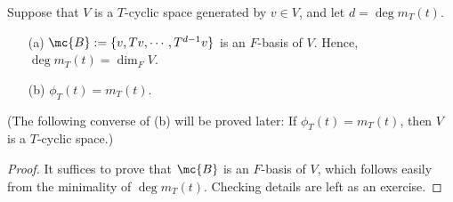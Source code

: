 \begin{lem}\label{T-cyclic basic}
    Suppose that $V$ is a $T$-cyclic space generated by $v\in V$, and let $d=\deg m_T(t)$.
    \begin{enumerate}
        \item[(a)]
        {
            $\mc{B}:=\{v, Tv, \cdots, T^{d-1}v\}$ is an $F$-basis of $V$.
            Hence, $\deg m_T(t)=\dim_F V$.
        }
        \item[(b)]
        {
            $\phi_T(t)=m_T(t)$.
        }
    \end{enumerate}
    (The following converse of (b) will be proved later: If $\phi_T(t)=m_T(t)$, then $V$ is a $T$-cyclic space.)
\end{lem}
\begin{proof}
    It suffices to prove that $\mc{B}$ is an $F$-basis of $V$, which follows easily from the minimality of $\deg m_T(t)$.
    \color{brown}Checking details are left as an exercise.\color{black}
\end{proof}

